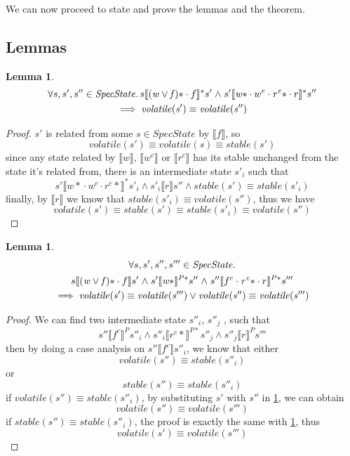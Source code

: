 \documentclass[letterpaper,twocolumn,10pt]{article}
\newtheorem{lemma}[theorem]{Lemma}
\theoremstyle{definition}
\newcommand{\conj}{\mathrel\land}
\renewcommand{\i}[1]{\ensuremath{\mathit{#1}}}
\begin{document}
We can now proceed to state and prove the lemmas and the theorem.

\subsection{Lemmas}

\begin{lemma}\label{lemma-2-1}
\begin{multline*}
	\forall s, s', s'' \in \i{SpecState} \ldotp s \llbracket \i{(w \lor f)\ast} \cdot f \rrbracket^* s' \conj s' \llbracket \i{w\ast} \cdot w^c \cdot \i{r^c\ast} \cdot r \rrbracket^* s'' \\
	  \implies \i{volatile(s')} \equiv \i{volatile(s'')}
\end{multline*}
\end{lemma}
\begin{proof}
	$s'$ is related from some $s \in \i{SpecState}$ by $\llbracket f \rrbracket$, so
		$$\i{volatile(s')} \equiv \i{volatile(s)} \equiv \i{stable(s')}$$
	since any state related by $\llbracket w \rrbracket$, $\llbracket w^c \rrbracket$ or $\llbracket r^c \rrbracket$ has its stable unchanged from the state it's related from, there is an intermediate state $s'_i$ such that
		$$s' \llbracket {w*} \cdot w^c \cdot {r^c *} \rrbracket^* s'_i \conj s'_i \llbracket r \rrbracket s'' \conj stable(s') \equiv stable(s'_i)$$
	finally, by $\llbracket r \rrbracket$ we know that $\i{stable(s'_i) \equiv volatile(s'')}$, thus we have
		$$\i{volatile(s') \equiv stable(s') \equiv stable(s'_i) \equiv volatile(s'')}$$
\end{proof}

\begin{lemma}\label{lemma-2-2}
\begin{multline*}
      \forall s, s', s'', s''' \in \i{SpecState} \ldotp \\
      s \llbracket \i{(w \lor f)\ast} \cdot f \rrbracket s' \conj
	  s' \llbracket \i{w\ast} \rrbracket^{P*} s'' \conj
	  s'' \llbracket f^c \cdot \i{r^c\ast} \cdot r \rrbracket^{P*} s'''\\ \implies \i{volatile(s')} \equiv \i{volatile(s''')} \lor \i{volatile(s'')} \equiv \i{volatile(s''')}
\end{multline*}
\end{lemma}
\begin{proof}
	We can find two intermediate state $s''_i$, $s''_j$ , such that $$s'' \llbracket f^c \rrbracket^P s''_i \conj s''_i \llbracket r^c* \rrbracket^{P*} s''_j \conj s''_j \llbracket r \rrbracket^P s'''$$
	then by doing a case analysis on $s'' \llbracket f^c \rrbracket s''_i$, we know that either $$\i{volatile(s'') \equiv stable(s''_i)}$$ or $$\i{stable(s'') \equiv stable(s''_i)}$$
	if $\i{volatile(s'') \equiv stable(s''_i)}$, by substituting $s'$ with $s''$ in
	\cref{lemma-2-1}, we can obtain $$\i{volatile(s'') \equiv volatile(s''')}$$
	if $\i{stable(s'') \equiv stable(s''_i)}$, the proof is exactly the same with \cref{lemma-2-1}, thus $$\i{volatile(s') \equiv volatile(s''')}$$
\end{proof}
\end{document}
